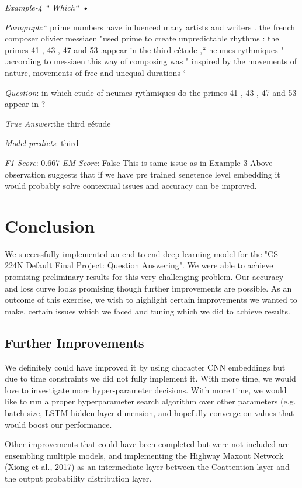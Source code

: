 \documentclass{article} %
\begin{document}
\emph{Example-4 ``  Which``   \textbf{•}}

\emph{Paragraph}:``  prime numbers have influenced many artists and writers . the french composer olivier messiaen "used prime  to create unpredictable rhythms : the primes 41 , 43 , 47 and 53 .appear in the third e\'étude ,``  neumes rythmiques " .according to messiaen this way of composing was " inspired by the movements of nature, movements of free and unequal durations `  

\emph{Question}: in which etude of neumes rythmiques do the primes 41 , 43 , 47 and 53 appear in ? 

\emph{True Answer}:the third e\'étude
 
\textit{Model predicts}:  third

\emph{F1 Score}: 0.667  
\emph{EM Score}: False
This is same issue as in Example-3
Above observation suggests that if we have pre trained senetence level  embedding it would probably solve contextual issues and accuracy can be improved.


\section{Conclusion}
We successfully implemented an end-to-end deep learning model for the "CS 224N Default Final Project: Question Answering".
We were able to achieve promising preliminary results for this very challenging problem. Our accuracy and loss curve looks  promising though further improvements are possible.
As an outcome of  this exercise, we wish to highlight certain improvements we wanted to make, certain issues which we faced and tuning which we did to achieve results.

\subsection{Further Improvements}
We definitely could have improved it by using character CNN embeddings  but due to time constraints we did not fully implement it.
With more time, we would love to investigate more hyper-parameter decisions. With more time, we would like to run a proper hyperparameter search algorithm over other parameters
(e.g. batch size, LSTM hidden layer dimension, and hopefully converge on values that would boost our performance.

Other improvements that could have been completed but were not included are
ensembling multiple models,
and implementing the Highway Maxout Network (Xiong et al., 2017)
as an intermediate layer between the Coattention layer and the output probability distribution layer.
\end{document}
